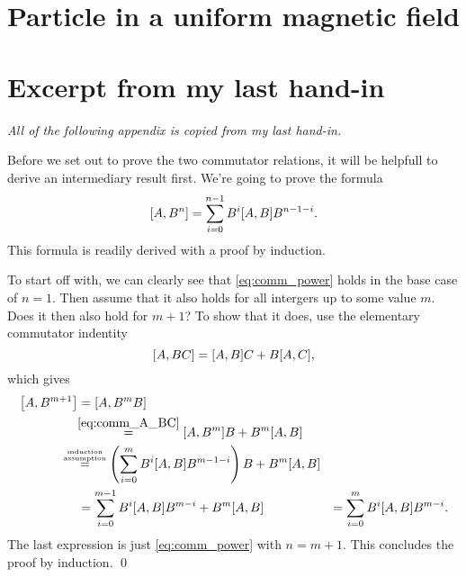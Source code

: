 \documentclass[11pt,letter, swedish, english
]{article}
\begin{document}
\section{Particle in a uniform magnetic field}

\newpage
\appendix


\section{Excerpt from my last hand-in}\label{sec:comm}
\textit{All of the following appendix is copied from my last hand-in.}

Before we set out to prove the two commutator relations, it will be
helpfull to derive an intermediary result first. We're going to prove
the formula
\begin{equation} \label{eq:comm_power}
\comm{A}{B^n} = \sum_{i=0}^{n-1} B^{i}\comm{A}{B}B^{n-1-i}.
\end{equation}
This formula is readily derived with a proof by induction. 

To start off with, we can clearly see that \eqref{eq:comm_power} holds
in the base case of $n=1$. Then assume that it also holds for all
intergers up to some value $m$. Does it then also hold for $m+1$?
To show that it does, use the elementary commutator
indentity
\begin{equation} \label{eq:comm_A_BC}
\comm{A}{BC} = \comm{A}{B}C+B\comm{A}{C},
\end{equation}
which gives
\begin{equation}
\begin{aligned}
\comm{A}{B^{m+1}} &= \comm{A}{B^{m}B} \\
&\hspace{-3pt}\stackrel{\eqref{eq:comm_A_BC}}{=} \comm{A}{B^{m}}B + B^m\comm{A}{B}\\
&\hspace{-14pt}\stackrel{\stackrel{\text{\tiny induction}}{\text{\tiny assumption}}}{=}
\left(\sum_{i=0}^{m} B^{i}\comm{A}{B}B^{m-1-i}\right) B + B^m\comm{A}{B}\\
&=\sum_{i=0}^{m-1} B^{i}\comm{A}{B}B^{m-i} + B^m\comm{A}{B}&=\sum_{i=0}^{m} B^{i}\comm{A}{B}B^{m-i}.
\end{aligned}
\end{equation}
The last expression is just \eqref{eq:comm_power} with $n=m+1$. This
concludes the proof by induction. \qed
\end{document}
